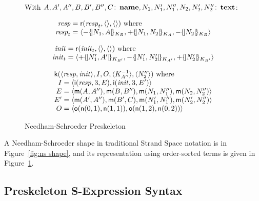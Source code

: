 \documentclass[12pt]{report}
\theoremstyle{definition}
\begin{document}
\begin{figure}
\begin{center}
With $A,A',A'',B,B',B'',C\colon
\operatorname{\mathbf{name}},N_1,N_1',N_1'',N_2,N_2',N_2''\colon\operatorname{\mathbf{text}}$:
\end{center}
$$
\begin{array}{r@{}c@{}l}
\fn{resp}&{}={}&\cn{r}(\fn{resp}_t, \seq{},\seq{})
\mbox{ where}\\
\fn{resp}_t&{}={}&\seq{
\inbnd\enc{N_1,A}{K_B},
\outbnd\enc{N_1,N_2}{K_A},
\inbnd\enc{N_2}{K_B}}
\end{array}
$$

$$
\begin{array}{r@{}c@{}l}
\fn{init}&{}={}&\cn{r}(\fn{init}_t, \seq{},\seq{})
\mbox{ where}\\
\fn{init}_t&{}={}&\seq{
\outbnd\enc{N_1',A'}{K_{B'}},
\inbnd\enc{N_1',N_2'}{K_{A'}},
\outbnd\enc{N_2'}{K_{B'}}}
\end{array}
$$

$$\begin{array}{r@{}c@{}l}
\multicolumn{3}{l}{\cn{k}(\seq{\fn{resp},\fn{init}},
I, O,\seq{K_{A''}^{-1}},\seq{N_2''})\mbox{ where}}\\
I&{}={}&\langle\cn{i}(\fn{resp}, 3, E),
\cn{i}(\fn{init}, 3, E')\rangle\\
E&{}={}&\seq{\cn{m}(A,A''),\cn{m}(B,B''),
\cn{m}(N_1,N_1''), \cn{m}(N_2,N_2'')}\\
E'&{}={}&\seq{\cn{m}(A',A''),\cn{m}(B',C),
\cn{m}(N_1',N_1''), \cn{m}(N_2',N_2'')}\\
O&{}={}&\seq{\cn{o}(\cn{n}(0,1),\cn{n}(1,1)),
\cn{o}(\cn{n}(1,2),\cn{n}(0,2))}
\end{array}$$
\caption{Needham-Schroeder Preskeleton}\label{fig:ns}
\end{figure}

A Needham-Schroeder shape in traditional Strand Space notation is in
Figure~\ref{fig:ns shape}, and its representation using order-sorted
terms is given in Figure~\ref{fig:ns}.

\subsection{Preskeleton S-Expression Syntax}
\end{document}
